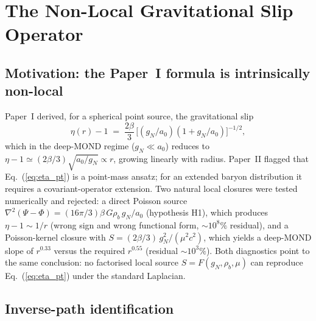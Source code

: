 \section{The Non-Local Gravitational Slip Operator}
\label{sec:nonlocal}

\subsection{Motivation: the Paper~I formula is intrinsically non-local}

Paper~I derived, for a spherical point source, the gravitational slip
\begin{equation}
\eta(r)-1 \;=\; \frac{2\beta}{3}\,
\bigl[(g_N/a_0)(1+g_N/a_0)\bigr]^{-1/2},
\label{eq:eta_pt}
\end{equation}
which in the deep-MOND regime ($g_N\ll a_0$) reduces to
$\eta-1\simeq (2\beta/3)\sqrt{a_0/g_N}\propto r$, growing linearly with
radius.  Paper~II flagged that Eq.~(\ref{eq:eta_pt}) is a point-mass
ansatz; for an extended baryon distribution it requires a
covariant-operator extension.  Two natural local closures were tested
numerically and rejected: a direct Poisson source
$\nabla^2(\Psi-\Phi) = (16\pi/3)\beta\, G\rho_b\, g_N/a_0$ (hypothesis
H1), which produces $\eta-1\sim 1/r$ (wrong sign and wrong functional
form, $\sim 10^{8}\%$ residual), and a Poisson-kernel closure with
$S=(2\beta/3)\,g_N^2/(\mu^2 c^2)$, which yields a deep-MOND slope of
$r^{0.33}$ versus the required $r^{0.55}$ (residual $\sim 10^3\%$).
Both diagnostics point to the same conclusion: no factorised local
source $S = F(g_N,\rho_b,\mu)$ can reproduce
Eq.~(\ref{eq:eta_pt}) under the standard Laplacian.

\subsection{Inverse-path identification}

